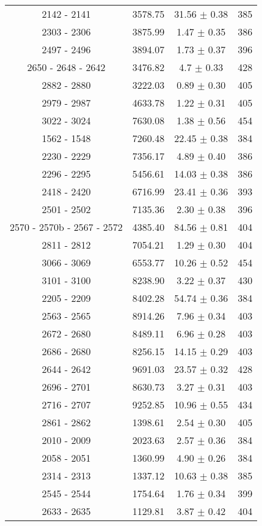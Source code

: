\begin{longtable}{cccc}
 2142 - 2141 &  3578.75 & 31.56 $\pm$ 0.38 & 385 \\
 2303 - 2306 &  3875.99 & 1.47 $\pm$ 0.35 & 386 \\
 2497 - 2496 &  3894.07 & 1.73 $\pm$ 0.37 & 396 \\
 2650 - 2648 - 2642 & 3476.82 & 4.7 $\pm$ 0.33 & 428 \\
 2882 - 2880 &  3222.03 & 0.89 $\pm$ 0.30 & 405 \\
 2979 - 2987 &  4633.78 & 1.22 $\pm$ 0.31 & 405 \\
 3022 - 3024 &  7630.08 & 1.38 $\pm$ 0.56 & 454 \\
 1562 - 1548 &  7260.48 & 22.45 $\pm$ 0.38 & 384 \\
 2230 - 2229 &  7356.17 & 4.89 $\pm$ 0.40 & 386 \\
 2296 - 2295 &  5456.61 & 14.03 $\pm$ 0.38 & 386 \\
 2418 - 2420 &  6716.99 & 23.41 $\pm$ 0.36 & 393 \\
 2501 - 2502 &  7135.36 & 2.30 $\pm$ 0.38 & 396 \\
 2570 - 2570b - 2567 - 2572 & 4385.40 & 84.56 $\pm$ 0.81 & 404 \\
 2811 - 2812 &  7054.21 & 1.29 $\pm$ 0.30 & 404 \\
 3066 - 3069 &  6553.77 & 10.26 $\pm$ 0.52 & 454 \\
 3101 - 3100 &  8238.90 & 3.22 $\pm$ 0.37 & 430 \\
 2205 - 2209 &  8402.28 & 54.74 $\pm$ 0.36 & 384 \\
 2563 - 2565 &  8914.26 & 7.96 $\pm$ 0.34 & 403 \\
 2672 - 2680 &  8489.11 & 6.96 $\pm$ 0.28 & 403 \\
 2686 - 2680 &  8256.15 & 14.15  $\pm$ 0.29 & 403 \\
 2644 - 2642 &  9691.03 & 23.57 $\pm$ 0.32 & 428 \\
 2696 - 2701 &  8630.73 & 3.27 $\pm$ 0.31 & 403 \\
 2716 - 2707 &  9252.85 & 10.96 $\pm$ 0.55 & 434 \\
 2861 - 2862 &  1398.61 & 2.54 $\pm$ 0.30 & 405 \\
 2010 - 2009 &  2023.63 & 2.57 $\pm$ 0.36 & 384 \\
 2058 - 2051 &  1360.99 & 4.90 $\pm$ 0.26 & 384 \\
 2314 - 2313 &  1337.12 & 10.63 $\pm$ 0.38 & 385 \\
 2545 - 2544 &  1754.64 & 1.76 $\pm$ 0.34 & 399 \\
 2633 - 2635 &  1129.81 & 3.87 $\pm$ 0.42 & 404 \\

\end{longtable}
